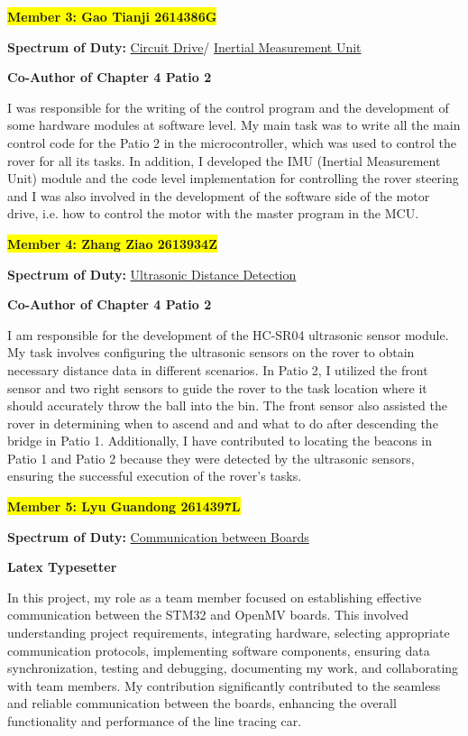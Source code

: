 \documentclass[12pt, a4paper, oneside]{report}
\begin{document}
\vspace{\baselineskip}


\colorbox{yellow}{\textbf{Member 3: Gao Tianji 2614386G} }
\begin{tcolorbox}
\textbf{Spectrum of Duty:} 
\hyperref[sec:CD]{\textcolor{mybg}{Circuit Drive}}/
\hyperref[sec:itm]{\textcolor{mybg}{Inertial Measurement Unit}}

\textbf{Co-Author of Chapter 4 Patio 2}
\end{tcolorbox}
I was responsible for the writing of the control program and the development of some hardware modules at software level. My main task was to write all the main control code for the Patio 2 in the microcontroller, which was used to control the rover for all its tasks. In addition, I developed the IMU (Inertial Measurement Unit) module and the code level implementation for controlling the rover steering and I was also involved in the development of the software side of the motor drive, i.e. how to control the motor with the master program in the MCU.
\vspace{\baselineskip}

\newpage
\colorbox{yellow}{\textbf{Member 4: Zhang Ziao 2613934Z} }
\begin{tcolorbox}
\textbf{Spectrum of Duty:} 
\hyperref[sec:SR-04]{\textcolor{mybg}{Ultrasonic Distance Detection}}

\textbf{Co-Author of Chapter 4 Patio 2}
\end{tcolorbox}
I am responsible for the development of the HC-SR04 ultrasonic sensor module. My task involves configuring the ultrasonic sensors on the rover to obtain necessary distance data in different scenarios. In Patio 2, I utilized the front sensor and two right sensors to guide the rover to the task location where it should accurately throw the ball into the bin. The front sensor also assisted the rover in determining when to ascend and and what to do after descending the bridge in Patio 1. Additionally, I have contributed to locating the beacons in Patio 1 and Patio 2 because they were detected by the ultrasonic sensors, ensuring the successful execution of the rover's tasks.
\vspace{\baselineskip}

\colorbox{yellow}{\textbf{Member 5: Lyu Guandong 2614397L} }
\begin{tcolorbox}
\textbf{Spectrum of Duty:} 
\hyperref[sec:itc]{\textcolor{mybg}{Communication between Boards}}

\textbf{Latex Typesetter}
\end{tcolorbox}
In this project, my role as a team member focused on establishing effective communication between the STM32 and OpenMV boards. This involved understanding project requirements, integrating hardware, selecting appropriate communication protocols, implementing software components, ensuring data synchronization, testing and debugging, documenting my work, and collaborating with team members. My contribution significantly contributed to the seamless and reliable communication between the boards, enhancing the overall functionality and performance of the line tracing car.
\vspace{\baselineskip}
\end{document}
